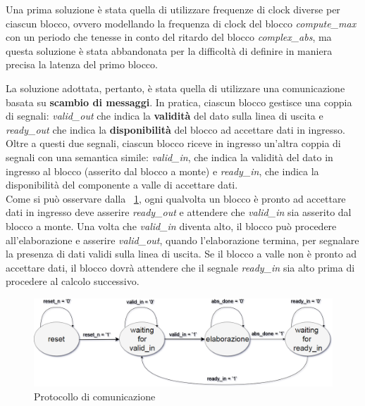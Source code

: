 \documentclass[12pt,a4paper,twoside,openany]{book}
\begin{document}
Una prima soluzione è stata quella di utilizzare frequenze di clock diverse per ciascun blocco, ovvero modellando la frequenza di clock del blocco \textit{compute\_max} con un periodo che tenesse in conto del ritardo del blocco \textit{complex\_abs}, ma questa soluzione è stata abbandonata per la difficoltà di definire in maniera precisa la latenza del primo blocco.

La soluzione adottata, pertanto, è stata quella di utilizzare una comunicazione basata su \textbf{scambio di messaggi}. In pratica, ciascun blocco gestisce una coppia di segnali: \textit{valid\_out} che indica la \textbf{validità} del dato sulla linea di uscita e \textit{ready\_out} che indica la \textbf{disponibilità} del blocco ad accettare dati in ingresso. Oltre a questi due segnali, ciascun blocco riceve in ingresso un'altra coppia di segnali con una semantica simile: \textit{valid\_in}, che indica la validità del dato in ingresso al blocco (asserito dal blocco a monte) e \textit{ready\_in}, che indica la disponibilità del componente a valle di accettare dati. \\
Come si può osservare dalla \figurename~\ref{wrapperabs_fsm}, ogni qualvolta un blocco è pronto ad accettare dati in ingresso deve asserire \textit{ready\_out} e attendere che \textit{valid\_in} sia asserito dal blocco a monte. Una volta che \textit{valid\_in} diventa alto, il blocco può procedere all'elaborazione e asserire \textit{valid\_out}, quando l'elaborazione termina, per segnalare la presenza di dati validi sulla linea di uscita. Se il blocco a valle non è pronto ad accettare dati, il blocco dovrà attendere che il segnale \textit{ready\_in} sia alto prima di procedere al calcolo successivo.

\begin{figure}
\begin{center}
\includegraphics[scale=0.35, keepaspectratio]{immagini/fsm_wrapper_abs}
\caption{Protocollo di comunicazione}
\label{wrapperabs_fsm}
\end{center}
\end{figure}
\end{document}
